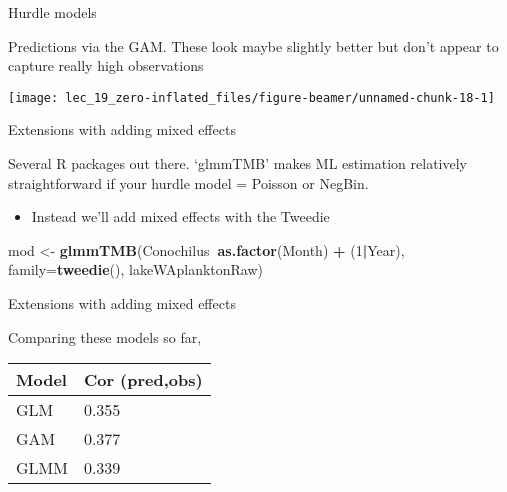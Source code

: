 \documentclass[ignorenonframetext,]{beamer}
\newenvironment{Shaded}{\begin{snugshade}}{\end{snugshade}}
\newcommand{\KeywordTok}[1]{\textcolor[rgb]{0.13,0.29,0.53}{\textbf{#1}}}
\newcommand{\DataTypeTok}[1]{\textcolor[rgb]{0.13,0.29,0.53}{#1}}
\newcommand{\DecValTok}[1]{\textcolor[rgb]{0.00,0.00,0.81}{#1}}
\newcommand{\StringTok}[1]{\textcolor[rgb]{0.31,0.60,0.02}{#1}}
\newcommand{\OperatorTok}[1]{\textcolor[rgb]{0.81,0.36,0.00}{\textbf{#1}}}
\newcommand{\NormalTok}[1]{#1}
\providecommand{\tightlist}{%
  \setlength{\itemsep}{0pt}\setlength{\parskip}{0pt}}
\begin{document}
\begin{frame}[fragile]{Hurdle models}

Predictions via the GAM. These look maybe slightly better but don't
appear to capture really high observations

\begin{Shaded}
\end{Shaded}

\begin{center}\texttt{[image: lec\_19\_zero-inflated\_files/figure-beamer/unnamed-chunk-18-1]} \end{center}

\end{frame}

\begin{frame}[fragile]{Extensions with adding mixed effects}

Several R packages out there. `glmmTMB' makes ML estimation relatively
straightforward if your hurdle model = Poisson or NegBin.

\begin{itemize}
\tightlist
\item
  Instead we'll add mixed effects with the Tweedie
\end{itemize}

\begin{Shaded}
\begin{Highlighting}[]
\NormalTok{mod <-}\StringTok{ }\KeywordTok{glmmTMB}\NormalTok{(Conochilus}\OperatorTok{~}\KeywordTok{as.factor}\NormalTok{(Month) }\OperatorTok{+}\StringTok{ }\NormalTok{(}\DecValTok{1}\OperatorTok{|}\NormalTok{Year), }
  \DataTypeTok{family=}\KeywordTok{tweedie}\NormalTok{(), lakeWAplanktonRaw)}
\end{Highlighting}
\end{Shaded}

\end{frame}

\begin{frame}{Extensions with adding mixed effects}

Comparing these models so far,

\begin{tabular}{l|l}
\hline
Model & Cor (pred,obs)\\
\hline
GLM & 0.355\\
\hline
GAM & 0.377\\
\hline
GLMM & 0.339\\
\hline
\end{tabular}

\end{frame}
\end{document}
